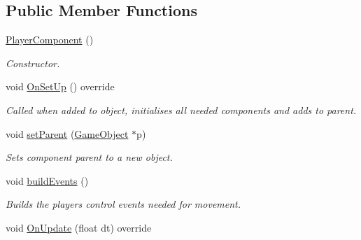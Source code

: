\subsection*{Public Member Functions}
\begin{DoxyCompactItemize}
\item 
\mbox{\label{class_player_component_adf9bdf600a6cc7d34aa848163c4a9be7}} 
\mbox{\hyperlink{class_player_component_adf9bdf600a6cc7d34aa848163c4a9be7}{Player\+Component}} ()
\begin{DoxyCompactList}\small\item\em Constructor. \end{DoxyCompactList}\item 
\mbox{\label{class_player_component_a949792196197b92dfc1631fb66234868}} 
void \mbox{\hyperlink{class_player_component_a949792196197b92dfc1631fb66234868}{On\+Set\+Up}} () override
\begin{DoxyCompactList}\small\item\em Called when added to object, initialises all needed components and adds to parent. \end{DoxyCompactList}\item 
\mbox{\label{class_player_component_a5a153f0d90650d6b9bf07fa2fac44ec3}} 
void \mbox{\hyperlink{class_player_component_a5a153f0d90650d6b9bf07fa2fac44ec3}{set\+Parent}} (\mbox{\hyperlink{class_game_object}{Game\+Object}} $\ast$p)
\begin{DoxyCompactList}\small\item\em Sets component parent to a new object. \end{DoxyCompactList}\item 
\mbox{\label{class_player_component_a057ce51dc6ef125a4e90ec8c92b2147b}} 
void \mbox{\hyperlink{class_player_component_a057ce51dc6ef125a4e90ec8c92b2147b}{build\+Events}} ()
\begin{DoxyCompactList}\small\item\em Builds the player\textquotesingle{}s control events needed for movement. \end{DoxyCompactList}\item 
\mbox{\label{class_player_component_a2e999887dae2451eebb7c173415d98be}} 
void \mbox{\hyperlink{class_player_component_a2e999887dae2451eebb7c173415d98be}{On\+Update}} (float dt) override

\end{DoxyCompactItemize}
